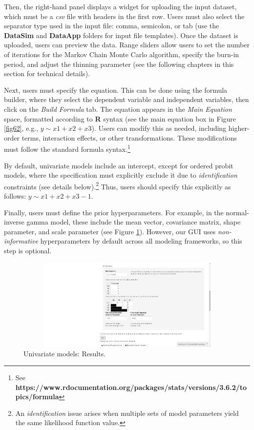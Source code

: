 Then, the right-hand panel displays a widget for uploading the input dataset, which must be a \textit{csv} file with headers in the first row. Users must also select the separator type used in the input file: comma, semicolon, or tab (use the \textbf{DataSim} and \textbf{DataApp} folders for input file templates). Once the dataset is uploaded, users can preview the data. Range sliders allow users to set the number of iterations for the Markov Chain Monte Carlo algorithm, specify the burn-in period, and adjust the thinning parameter (see the following chapters in this section for technical details).

Next, users must specify the equation. This can be done using the formula builder, where they select the dependent variable and independent variables, then click on the \textit{Build Formula} tab. The equation appears in the \textit{Main Equation} space, formatted according to \textbf{R} syntax (see the main equation box in Figure \ref{fig62}, e.g., $y\sim x1+x2+x3$). Users can modify this as needed, including higher-order terms, interaction effects, or other transformations. These modifications must follow the standard formula syntax.\footnote{See \textbf{https://www.rdocumentation.org/packages/stats/versions/3.6.2/topics/formula}}

By default, univariate models include an intercept, except for ordered probit models, where the specification must explicitly exclude it due to \textit{identification} constraints (see details below).\footnote{An \textit{identification} issue arises when multiple sets of model parameters yield the same likelihood function value.} Thus, users should specify this explicitly as follows: $y\sim x1+x2+x3-1$.

Finally, users must define the prior hyperparameters. For example, in the normal-inverse gamma model, these include the mean vector, covariance matrix, shape parameter, and scale parameter (see Figure \ref{fig63}). However, our GUI uses \textit{non-informative} hyperparameters by default across all modeling frameworks, so this step is optional.

\begin{figure}
	\includegraphics[width=340pt, height=130pt]{Chapters/chapterGUI/figures/Figure3.jpg}
	\caption[List of figure caption goes here]{Univariate models: Results.}\label{fig63}
\end{figure}

